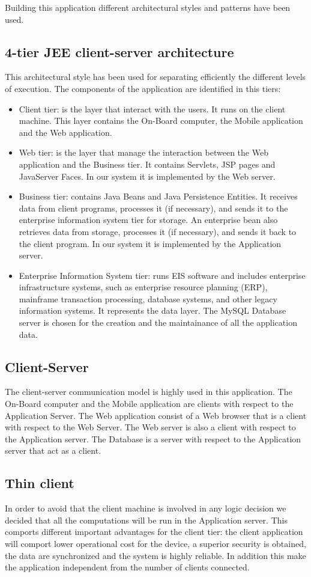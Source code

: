 Building this application different architectural styles and patterns have been used.
\subsection{4-tier JEE client-server architecture}
	This architectural style has been used for separating efficiently the different levels of execution. The components of the application are identified in this tiers:
	\begin{itemize}
		\item{Client tier: is the layer that interact with the users. It runs on the client machine. This layer contains the On-Board computer, the Mobile application and the Web application.}
		\item{Web tier: is the layer that manage the interaction between the Web application and the Business tier. It contains Servlets, JSP pages and JavaServer Faces. In our system it is implemented by the Web server.}%
		\item{Business tier: contains Java Beans and Java Persistence Entities. It receives data from client programs, processes it (if necessary), and sends it to the enterprise information system tier for storage. An enterprise bean also retrieves data from storage, processes it (if necessary), and sends it back to the client program. In our system it is implemented by the Application server.}
		\item{Enterprise Information System tier: runs EIS software and includes enterprise infrastructure systems, such as enterprise resource planning (ERP), mainframe transaction processing, database systems, and other legacy information systems. It represents the data layer. The MySQL Database server is chosen for the creation and the maintainance of all the application data.}
	\end{itemize}
\subsection{Client-Server}
	The client-server communication model is highly used in this application.
	The On-Board computer and the Mobile application are clients with respect to the Application Server. The Web application consist of a Web browser that is a client with respect to the Web Server. The Web server is also a client with respect to the Application server. The Database is a server with respect to the Application server that act as a client.
\subsection{Thin client}
	In order to avoid that the client machine is involved in any logic decision we decided that all the computations will be run in the Application server. This comports different important advantages for the client tier: the client application will comport lower operational cost for the device, a superior security is obtained, the data are synchronized and the system is highly reliable. In addition this make the application independent from the number of clients connected.
